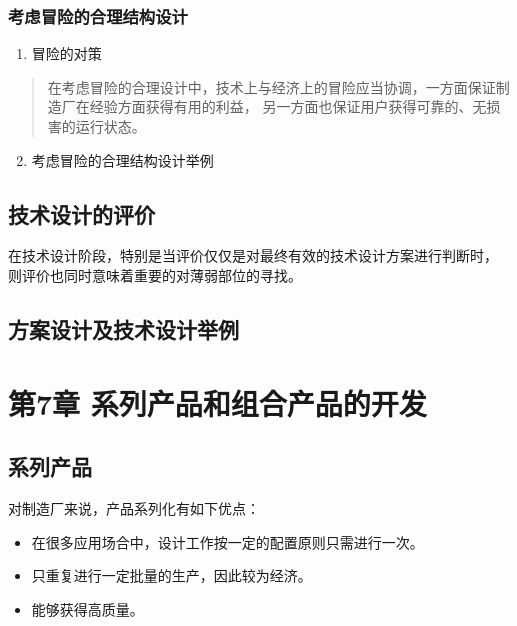 \documentclass[letterpaper,10pt,english]{sphinxmanual}
\begin{document}
\subsection{考虑冒险的合理结构设计}
\label{unit6:id26}\begin{enumerate}
\item {} 
冒险的对策

\end{enumerate}
\begin{quote}

在考虑冒险的合理设计中，技术上与经济上的冒险应当协调，一方面保证制造厂在经验方面获得有用的利益，
另一方面也保证用户获得可靠的、无损害的运行状态。
\end{quote}
\begin{enumerate}
\setcounter{enumi}{1}
\item {} 
考虑冒险的合理结构设计举例

\end{enumerate}


\section{技术设计的评价}
\label{unit6:id27}
在技术设计阶段，特别是当评价仅仅是对最终有效的技术设计方案进行判断时，
则评价也同时意味着重要的对薄弱部位的寻找。


\section{方案设计及技术设计举例}
\label{unit6:id28}

\chapter{第7章 系列产品和组合产品的开发}
\label{unit7::doc}\label{unit7:id1}

\section{系列产品}
\label{unit7:id2}
对制造厂来说，产品系列化有如下优点：
\begin{itemize}
\item {} 
在很多应用场合中，设计工作按一定的配置原则只需进行一次。

\item {} 
只重复进行一定批量的生产，因此较为经济。

\item {} 
能够获得高质量。

\end{itemize}
\end{document}
